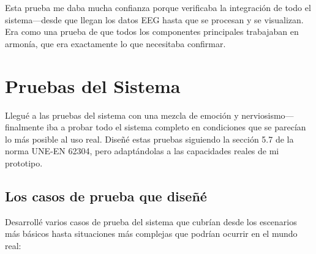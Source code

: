 Esta prueba me daba mucha confianza porque verificaba la integración de todo el sistema—desde que llegan los datos EEG hasta que se procesan y se visualizan. Era como una prueba de que todos los componentes principales trabajaban en armonía, que era exactamente lo que necesitaba confirmar.

\newpage
\section{Pruebas del Sistema}

Llegué a las pruebas del sistema con una mezcla de emoción y nerviosismo—finalmente iba a probar todo el sistema completo en condiciones que se parecían lo más posible al uso real. Diseñé estas pruebas siguiendo la sección 5.7 de la norma UNE-EN 62304, pero adaptándolas a las capacidades reales de mi prototipo.

\subsection{Los casos de prueba que diseñé}

Desarrollé varios casos de prueba del sistema que cubrían desde los escenarios más básicos hasta situaciones más complejas que podrían ocurrir en el mundo real:


